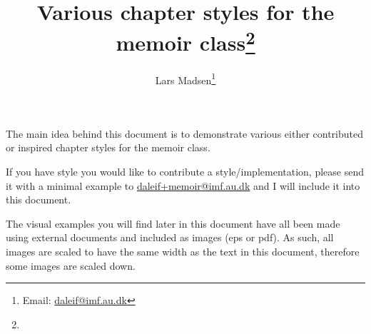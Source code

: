 \newenvironment{showchapterstyle}[1]{%
\SCS@fullfalse\@showchapterstyle{#1}}{\end@showchapterstyle}
\newenvironment{showchapterstyle*}[1]{%
\SCS@fulltrue\@showchapterstyle{#1}}{\end@showchapterstyle\SCS@fullfalse}
\newcommand\@Arg[1]{\textnormal{$\langle$\textit{#1}$\rangle$}}
\newcommand\@Args[1]{\texttt{\{\textnormal{$\langle$\textit{#1}$\rangle$}\}}}
\newcommand\Arg{\@ifstar{\@Args}{\@Arg}}
\newcommand\cs[1]{\texttt{\textbackslash #1}}
\makeatother
\newenvironment{syntax}{%
  \vskip.5\onelineskip%
  \begin{adjustwidth}{0pt}{0pt}
    \parindent=0pt%
    \obeylines%
    \let\\=\relax%
  }{%
  \end{adjustwidth}%
  \vskip.5\onelineskip%
}
\newenvironment{syntax*}{%
  \vskip.5\onelineskip%
  \begin{adjustwidth}{0pt}{0pt}
    \parindent=0pt%
  }{%
  \end{adjustwidth}%
  \vskip.5\onelineskip%
}

\newtheorem{remark}{Remark}

\pagestyle{plain}

\ifpdf
\usepackage[colorlinks]{hyperref}
\usepackage{memhfixc}
\fi





\title{Various chapter styles for the memoir class\thanks{\MyFileVersion}}
\author{Lars Madsen\thanks{Email: \protect\url{daleif@imf.au.dk}}}
\maketitle

The main idea behind this document is to demonstrate various either
contributed or inspired chapter styles for the memoir class.

If you have style you would like to contribute a style/implementation,
please send it with a minimal example to \url{daleif+memoir@imf.au.dk}
and I will include it into this document.

\bigskip
\starbreak

\bigskip


\noindent The visual examples you will find later in this document
have all been made using external documents and included as images
(eps or pdf). As such, all images are scaled to have the same width as
the  text in this document, therefore some images are scaled down.


